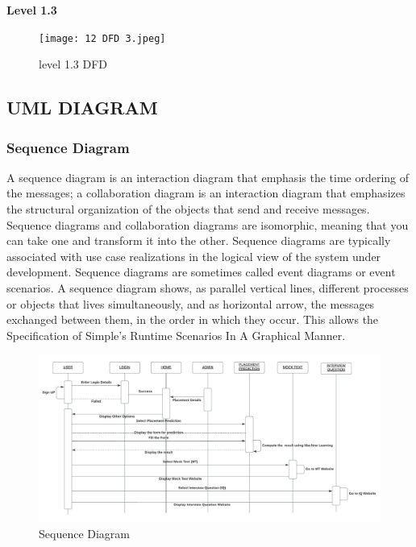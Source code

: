 \documentclass[12pt]{article}
\begin{document}
\begin{enumerate}
\begin{flushleft}\textbf{Level 1.3}\end{flushleft}


\begin{figure}[h!]
\begin{center}
\texttt{[image: 12 DFD 3.jpeg]}
\caption{ level 1.3 DFD}
\end{center}
\end{figure}





\newpage

\subsection{UML DIAGRAM}

\subsubsection{Sequence Diagram}

A sequence diagram is an interaction diagram that emphasis the time
ordering of the messages; a collaboration diagram is an interaction diagram that
emphasizes the structural organization of the objects that send and receive messages.
Sequence diagrams and collaboration diagrams are isomorphic, meaning that you
can take one and transform it into the other. Sequence diagrams are typically
associated with use case realizations in the logical view of the system under
development. Sequence diagrams are sometimes called event diagrams or event
scenarios. A sequence diagram shows, as parallel vertical lines, different processes or
objects that lives simultaneously, and as horizontal arrow, the messages exchanged
between them, in the order in which they occur. This allows the Specification of
Simple’s Runtime Scenarios In A Graphical Manner.
\\ 

\begin{figure}[h!]
\begin{center}
\includegraphics[scale=.4]{sequence diagram}
\caption{Sequence Diagram}
\end{center}
\end{figure}


\end{enumerate}
\end{document}
